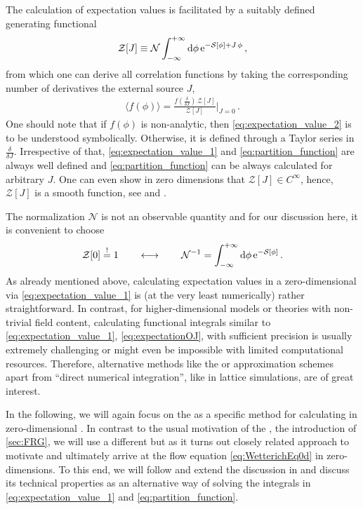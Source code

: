The calculation of expectation values is facilitated by a suitably defined generating functional
\begin{align}
	\mathcal{Z} [J] \equiv \mathcal{N} \int_{-\infty}^{+\infty} \dif \phi \, \eu^{- \mathcal{S}[\phi] + J \, \phi} \, , \label{eq:partition_function}
\end{align}
from which one can derive all correlation functions by taking the corresponding number of derivatives \wrt{} the external source $J$,
\begin{align}
	\langle f(\phi) \rangle = \frac{f(\tfrac{\delta}{\delta J}) \, \mathcal{Z}[J]}{\mathcal{Z}[J]} \bigg|_{J = 0} \, .	\label{eq:expectation_value_2}
\end{align}
One should note that if $f(\phi)$ is non-analytic, then \cref{eq:expectation_value_2} is to be understood symbolically.
Otherwise, it is defined through a Taylor series in $\frac{\delta}{\delta J}$.
Irrespective of that, \cref{eq:expectation_value_1} and \eqref{eq:partition_function} are always well defined and \cref{eq:partition_function} can be always calculated for arbitrary $J$.
One can even show in zero dimensions that $\mathcal{Z}[J] \in C^\infty$, hence, $\mathcal{Z}[J]$ is a smooth function, see  and \MWApp{}.

The normalization $\mathcal{N}$ is not an observable quantity and for our discussion here, it is convenient to choose
\begin{align}
		\mathcal{Z} [ 0 ] \overset{!}{=} 1 \qquad \longleftrightarrow \qquad \mathcal{N}^{-1} = \int_{-\infty}^{+\infty} \dif \phi \, \eu^{ - \mathcal{S} [\phi] } \, .	\label{eq:normalization}
\end{align}
As already mentioned above, calculating expectation values in a zero-dimensional \qft{} via \cref{eq:expectation_value_1} is (at the very least numerically) rather straightforward.
In contrast, for higher-dimensional models or theories with non-trivial field content, calculating functional integrals similar to \cref{eq:expectation_value_1}, \cf{} \cref{eq:expectationOJ}, with sufficient precision is usually extremely challenging or might even be impossible with limited computational resources.
Therefore, alternative methods like the \frg{} or approximation schemes apart from ``direct numerical integration'', like in lattice simulations, are of great interest.

In the following, we will again focus on the \frg{} as a specific method for calculating \nptFunctions{} in zero-dimensional \qfts{}.
In contrast to the usual motivation of the \frg{}, \cf{} the introduction of \cref{sec:FRG}, we will use a different but as it turns out closely related approach to motivate and ultimately arrive at the \frg{} flow equation \eqref{eq:WetterichEq0d} in zero-dimensions.
To this end, we will follow and extend the discussion in  and discuss its technical properties as an alternative way of solving the integrals in \cref{eq:expectation_value_1} and \eqref{eq:partition_function}.


